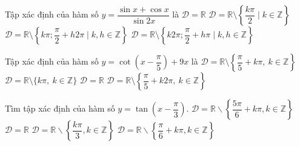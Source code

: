 \begin{ex}%
	Tập xác định của hàm số $y=\dfrac{\sin  x+\cos x}{\sin 2x}$ là
	 \choice
		 {$\mathscr{D}=\mathbb{R}$}
		{\True $\mathscr{D}=\mathbb{R}\setminus  \left\{\dfrac{k\pi}{2}\mid k\in \mathbb{Z}\right\}$}
		{\True $\mathscr{D}=\mathbb{R}\setminus \left\{k\pi; \dfrac{\pi}{2}+h2\pi\mid k,h\in \mathbb{Z}\right\}$} 
		 {$\mathscr{D}=\mathbb{R}\setminus \left\{k2\pi; \dfrac{\pi}{2}+h\pi\mid k,h\in \mathbb{Z}\right\}$}
\end{ex}

\begin{ex}%
	Tập xác định của hàm số $y=\cot \left(x-\dfrac{\pi}{5}\right)+9x$  là
	\choice 
		{\True $\mathscr{D}=\mathbb{R} \setminus\left\{\dfrac{\pi}{5}+k \pi,~k \in  \mathbb{Z}\right\}$}
		{$\mathscr{D}=\mathbb{R}  \setminus\{k \pi,~k \in \mathbb{Z}\}$}
		 {$\mathscr{D}=\mathbb{R}$}
		{$\mathscr{D}=\mathbb{R} \setminus\left\{\dfrac{\pi}{5}+k 2\pi,~k  \in \mathbb{Z}\right\}$}
\end{ex}

\begin{ex}%
	Tìm tập xác định của hàm số $y=\tan\left(x-\dfrac{\pi}{3}\right)$. 
	\choice 
		{\True $\mathscr{D}=\mathbb{R}\backslash\left\{\dfrac{5\pi}{6}+k\pi , k\in\mathbb{Z}\right\}$} 
		{$\mathscr{D}=\mathbb{R}$} 
		 {$\mathscr{D}=\mathbb{R}\backslash\left\{\dfrac{k\pi}{3}, k\in\mathbb{Z}\right\}$}
		{$\mathscr{D}=\mathbb{R}\backslash\left\{\dfrac{\pi}{6}+k\pi,  k\in\mathbb{Z}\right\}$}
\end{ex}

